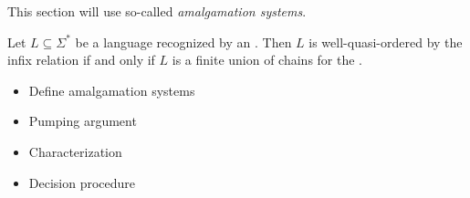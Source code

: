This section will use so-called \emph{amalgamation systems}.

\begin{theorem}
    \label{infix-amalgamation:thm}
    Let $L \subseteq \Sigma^*$ be a language recognized by an 
    .
    Then $L$ is well-quasi-ordered by the infix relation if and only if $L$ is
    a finite union of chains for the .
\end{theorem}

\begin{itemize}
    \item Define amalgamation systems
    \item Pumping argument
    \item Characterization
    \item Decision procedure
\end{itemize}
